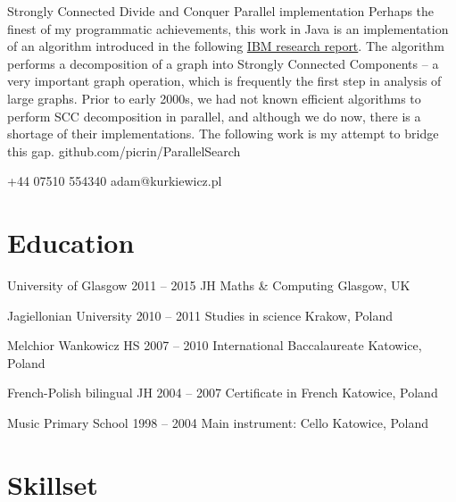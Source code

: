 \documentclass{tccv}
\begin{document}
\begin{eventlist}
\item{Strongly Connected Divide and Conquer}
     {Parallel implementation}
     {Perhaps the finest of my programmatic achievements, this work in Java is an implementation of an algorithm introduced in the following \href{http://domino.research.ibm.com/library/cyberdig.nsf/1e4115aea78b6e7c85256b360066f0d4/d8e3597a4172437b8525709f006e42b0?OpenDocument}{IBM research report}. The algorithm performs a decomposition of a graph into Strongly Connected Components -- a very important graph operation, which is frequently the first step in analysis of large graphs. Prior to early 2000s, we had not known efficient algorithms to perform SCC decomposition in parallel, and although we do now, there is a shortage of their implementations. The following work is my attempt to bridge this gap.}
    {github.com/picrin/ParallelSearch}

\end{eventlist}

    {+44 07510 554340}
    {adam@kurkiewicz.pl}

\section{Education}

\begin{yearlist}

\item[University of Glasgow]
     {2011 -- 2015}
     {JH Maths \& Computing}
     {Glasgow, UK}

\item[Jagiellonian University]
     {2010 -- 2011}
     {Studies in science}
     {Krakow, Poland}

\item[Melchior Wankowicz HS]
     {2007 -- 2010}
     {International Baccalaureate}
     {Katowice, Poland}

\item[French-Polish bilingual JH]
     {2004 -- 2007}
     {Certificate in French}
     {Katowice, Poland}
\item[Music Primary School]
     {1998 -- 2004}
     {Main instrument: Cello}
     {Katowice, Poland}

\end{yearlist}

\section{Skillset}
\end{document}
